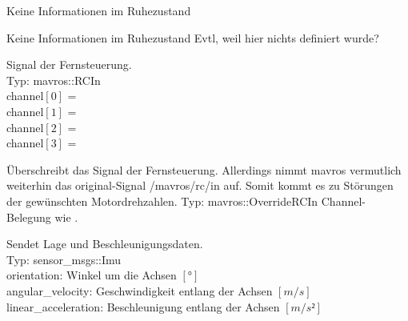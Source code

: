 

















Keine Informationen im Ruhezustand

Keine Informationen im Ruhezustand
Evtl, weil hier nichts definiert wurde?
















Signal der Fernsteuerung. \\
Typ: mavros::RCIn \\
channel$[0]$ = \\
channel$[1]$ = \\
channel$[2]$ = \\
channel$[3]$ = 


Überschreibt das Signal der Fernsteuerung. Allerdings nimmt mavros vermutlich weiterhin das original-Signal /mavros/rc/in auf. Somit kommt es zu Störungen der gewünschten Motordrehzahlen. 
Typ: mavros::OverrideRCIn
Channel-Belegung wie .













Sendet Lage und Beschleunigungsdaten.\\
Typ: sensor_msgs::Imu \\
orientation: Winkel um die Achsen $[°]$\\
angular\_velocity: Geschwindigkeit entlang der Achsen $[m/s]$\\
linear\_acceleration: Beschleunigung entlang der Achsen $[m/s²]$


